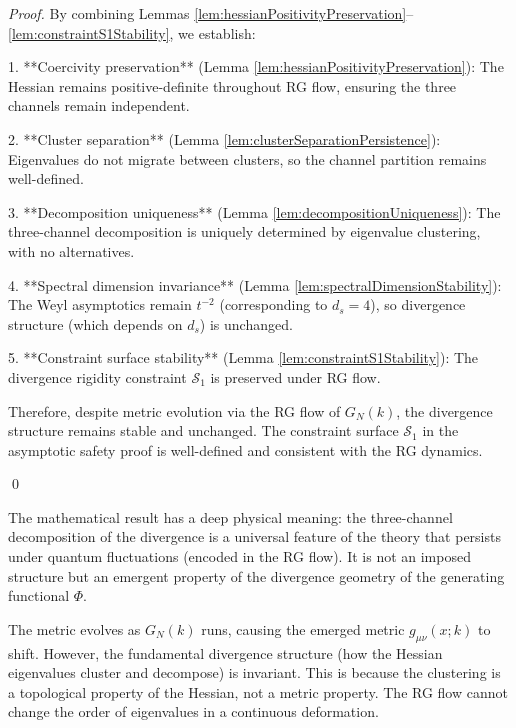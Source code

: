 \begin{proof}
By combining Lemmas \ref{lem:hessianPositivityPreservation}--\ref{lem:constraintS1Stability}, we establish:

1. **Coercivity preservation** (Lemma \ref{lem:hessianPositivityPreservation}): The Hessian remains positive-definite throughout RG flow, ensuring the three channels remain independent.

2. **Cluster separation** (Lemma \ref{lem:clusterSeparationPersistence}): Eigenvalues do not migrate between clusters, so the channel partition remains well-defined.

3. **Decomposition uniqueness** (Lemma \ref{lem:decompositionUniqueness}): The three-channel decomposition is uniquely determined by eigenvalue clustering, with no alternatives.

4. **Spectral dimension invariance** (Lemma \ref{lem:spectralDimensionStability}): The Weyl asymptotics remain $t^{-2}$ (corresponding to $d_s = 4$), so divergence structure (which depends on $d_s$) is unchanged.

5. **Constraint surface stability** (Lemma \ref{lem:constraintS1Stability}): The divergence rigidity constraint $\mathcal{S}_1$ is preserved under RG flow.

Therefore, despite metric evolution via the RG flow of $G_N(k)$, the divergence structure remains stable and unchanged. The constraint surface $\mathcal{S}_1$ in the asymptotic safety proof is well-defined and consistent with the RG dynamics.

\qed

\end{proof}

\begin{remark}
\label{rem:divergenceRigidityPhysical}

The mathematical result has a deep physical meaning: the three-channel decomposition of the divergence is a universal feature of the theory that persists under quantum fluctuations (encoded in the RG flow). It is not an imposed structure but an emergent property of the divergence geometry of the generating functional $\Phi$.

The metric evolves as $G_N(k)$ runs, causing the emerged metric $g_{\mu\nu}(x; k)$ to shift. However, the fundamental divergence structure (how the Hessian eigenvalues cluster and decompose) is invariant. This is because the clustering is a topological property of the Hessian, not a metric property. The RG flow cannot change the order of eigenvalues in a continuous deformation.

\end{remark}

